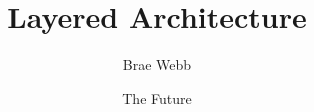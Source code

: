 \documentclass{csse4400}
\title{Layered Architecture}
\author{Brae Webb}
\date{{\color{red} The Future}}
\begin{document}
\makecover





\end{document}
